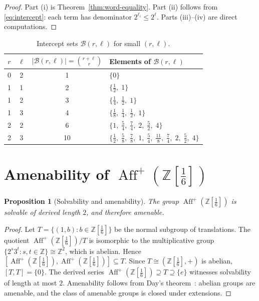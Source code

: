 \documentclass[12pt, a4paper]{amsart}
\theoremstyle{plain}
\newtheorem{proposition}[theorem]{Proposition}
\theoremstyle{definition}
\theoremstyle{remark}
\newcommand{\Z}{\mathbb{Z}}
\newcommand{\Zs}{\Z[\tfrac{1}{6}]}
\newcommand{\Aff}{\operatorname{Aff}}
\begin{document}
\begin{proof}
  Part (i) is Theorem~\ref{thm:word-equality}.  Part (ii) follows
  from \eqref{eq:intercept}: each term has denominator $2^{\ell_i}
  \leq 2^\ell$.  Parts (iii)--(iv) are direct computations.
\end{proof}

\begin{table}[ht]
  \centering
  \caption{Intercept sets $\mathcal{B}(r,\ell)$ for small $(r,\ell)$.}
  \medskip
  \begin{tabular}{c c c l}
    \toprule
    $r$ & $\ell$ & $\bigl|\mathcal{B}(r,\ell)\bigr|=\binom{r+\ell}{r}$
        & Elements of $\mathcal{B}(r,\ell)$ \\
    \midrule
    0 & 2 & 1 & $\{0\}$ \\
    1 & 1 & 2 & $\bigl\{\tfrac{1}{2},\; 1\bigr\}$ \\
    1 & 2 & 3 & $\bigl\{\tfrac{1}{4},\; \tfrac{1}{2},\; 1\bigr\}$ \\
    1 & 3 & 4 &
      $\bigl\{\tfrac{1}{8},\;\tfrac{1}{4},\;\tfrac{1}{2},\;1\bigr\}$ \\
    2 & 2 & 6 &
      $\bigl\{1,\;\tfrac{5}{4},\;\tfrac{7}{4},\;2,\;\tfrac{5}{2},\;4\bigr\}$ \\
    2 & 3 & 10 &
      $\bigl\{\tfrac{1}{2},\;\tfrac{5}{8},\;\tfrac{7}{8},\;1,\;\tfrac{5}{4},\;
               \tfrac{11}{8},\;\tfrac{7}{4},\;2,\;\tfrac{5}{2},\;4\bigr\}$ \\
    \bottomrule
  \end{tabular}
\end{table}

\section{Amenability of $\Aff^+(\Zs)$}
\label{sec:amenable}

\begin{proposition}[Solvability and amenability]
  \label{prop:amenable}
  The group $\Aff^+(\Zs)$ is solvable of derived length $2$, and
  therefore amenable.
\end{proposition}

\begin{proof}
  Let $T = \{(1,b) : b\in\Zs\}$ be the normal subgroup of translations.
  The quotient $\Aff^+(\Zs)/T$ is isomorphic to the multiplicative
  group $\{2^s 3^t : s,t\in\Z\}\cong\Z^2$, which is abelian.  Hence
  $[\Aff^+(\Zs),\Aff^+(\Zs)]\subseteq T$.
  Since $T\cong(\Zs,+)$ is abelian, $[T,T]=\{0\}$.
  The derived series
  $\Aff^+(\Zs)\supseteq T\supseteq\{e\}$ witnesses solvability of
  length at most $2$.
  Amenability follows from Day's theorem~\cite{Day1957}: abelian groups
  are amenable, and the class of amenable groups is closed under
  extensions.
\end{proof}
\end{document}
